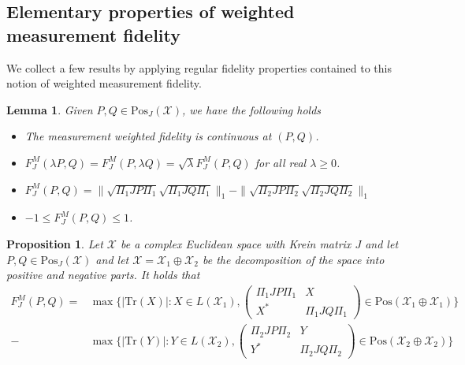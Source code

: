 \documentclass{amsart}
\numberwithin{equation}{section}
\newtheorem{lemma}[theorem]{Lemma}
\newtheorem{proposition}[theorem]{Proposition}
\theoremstyle{definition}
\theoremstyle{plain}
\theoremstyle{solutionstyle}
\begin{document}
\subsection{Elementary properties of weighted measurement fidelity}
We collect a few results by applying regular fidelity properties contained \cite{Watrous_2018} to this notion of weighted measurement fidelity.
\begin{lemma}
    Given $P,Q\in\mathrm{{Pos}}_{J}(\mathcal{X})$, we have the following holds
    \begin{itemize}
        \item The measurement weighted fidelity is continuous at $(P,Q)$.
        \item $F_J^M(\lambda P,Q)=F_J^M(P,\lambda Q)=\sqrt{\lambda}F_J^M(P,Q)$ for all real $\lambda\geq 0$.
        \item $F_J^M(P,Q)=\|\sqrt{\Pi_1JP\Pi_1}\sqrt{\Pi_1JQ\Pi_1}\|_1-\|\sqrt{\Pi_2JP\Pi_2}\sqrt{\Pi_2JQ\Pi_2}\|_1$
        \item $-1\leq F_J^M(P,Q)\leq 1$.
    \end{itemize}

\end{lemma}
\begin{proposition}
    Let $\mathcal{X}$ be a complex Euclidean space with Krein matrix $J$ and let $P,Q\in \mathrm{Pos}_J(\mathcal{X})$ and let $\mathcal{X}=\mathcal{X}_1\oplus\mathcal{X}_2$ be the decomposition of the space into positive and negative parts. It holds that 
    \begin{align*}F_J^M(P,Q)=&\max\{|\mathrm{Tr}(X)|:X\in L(\mathcal{X}_1), \begin{pmatrix}
        \Pi_1JP\Pi_1& X\\
        X^*& \Pi_1JQ\Pi_1
    \end{pmatrix}\in\mathrm{Pos}(\mathcal{X}_1\oplus\mathcal{X}_1)\}\\-&\max\{|\mathrm{Tr}(Y)|:Y\in L(\mathcal{X}_2), \begin{pmatrix}
        \Pi_2JP\Pi_2 & Y\\
        Y^* & \Pi_2JQ\Pi_2
    \end{pmatrix} \in \mathrm{Pos}(\mathcal{X}_2\oplus\mathcal{X}_2)\}
    \end{align*}
\end{proposition}
\end{document}
